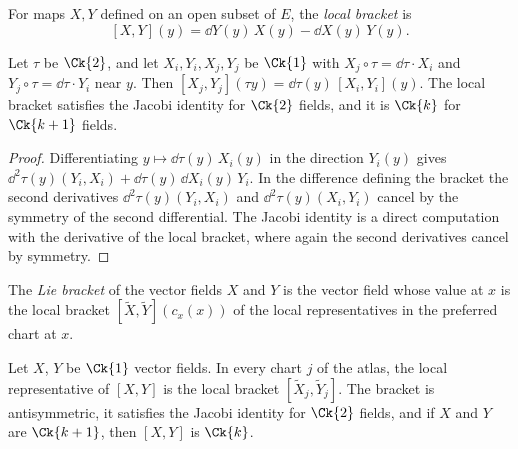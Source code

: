 For maps $X, Y$ defined on an open subset of $E$, the \emph{local bracket} is
\[
  [X, Y](y) = \dd Y(y)\,X(y) - \dd X(y)\,Y(y).
\]

\begin{lemma}
  \label{lem:man-local-bracket}
  \leanok
  Let $\tau$ be $\Ck{2}$, and let $X_i, Y_i, X_j, Y_j$ be $\Ck{1}$ with
  $X_j \circ \tau = \dd\tau \cdot X_i$ and $Y_j \circ \tau = \dd\tau \cdot Y_i$ near $y$. Then
  $[X_j, Y_j](\tau y) = \dd\tau(y)\,[X_i, Y_i](y)$. The local bracket satisfies the Jacobi identity
  for $\Ck{2}$ fields, and it is $\Ck{k}$ for $\Ck{k+1}$ fields.
\end{lemma}

\begin{proof}
  \leanok
  Differentiating $y \mapsto \dd\tau(y)\,X_i(y)$ in the direction $Y_i(y)$ gives
  $\dd^2\tau(y)(Y_i, X_i) + \dd\tau(y)\,\dd X_i(y)\,Y_i$. In the difference defining the bracket
  the second derivatives $\dd^2\tau(y)(Y_i, X_i)$ and $\dd^2\tau(y)(X_i, Y_i)$ cancel by the
  symmetry of the second differential. The Jacobi identity is a direct computation with the
  derivative of the local bracket, where again the second derivatives cancel by symmetry.
\end{proof}

\begin{definition}
  \label{def:man-lie-bracket}
  \leanok
  The \emph{Lie bracket} of the vector fields $X$ and $Y$ is the vector field whose value at $x$
  is the local bracket $[\widetilde{X}, \widetilde{Y}](c_x(x))$ of the local representatives in
  the preferred chart at $x$.
\end{definition}

\begin{theorem}
  \label{thm:man-lie-bracket}
  \leanok
  Let $X$, $Y$ be $\Ck{1}$ vector fields. In every chart $j$ of the atlas, the local
  representative of $[X, Y]$ is the local bracket $[\widetilde{X}_j, \widetilde{Y}_j]$. The
  bracket is antisymmetric, it satisfies the Jacobi identity for $\Ck{2}$ fields, and if $X$ and
  $Y$ are $\Ck{k+1}$, then $[X, Y]$ is $\Ck{k}$.
\end{theorem}

